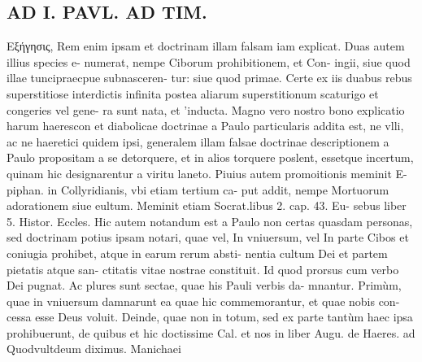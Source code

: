 \documentclass{article}
\begin{document}
\begin{pages}
\section*{AD I. PAVL. AD TIM. }
\marginpar{[ p.188 ]}\pstart Εξήγησις, Rem enim ipsam et doctrinam illam falsam iam explicat. Duas autem illius species e- numerat, nempe Ciborum prohibitionem, et Con- ingii, siue quod illae tuncipraecpue subnasceren- tur: siue quod primae. Certe ex iis duabus rebus superstitiose interdictis infinita postea aliarum superstitionum scaturigo et congeries vel gene- ra sunt nata, et ’inducta. Magno vero nostro bono explicatio harum haerescon et diabolicae doctrinae a Paulo particularis addita est, ne vlli, ac ne haeretici quidem ipsi, generalem illam falsae doctrinae descriptionem a Paulo propositam a se detorquere, et in alios torquere poslent, essetque  incertum, quinam hic designarentur a viritu laneto. Piuius autem promoitionis meminit E- piphan. in Collyridianis, vbi etiam tertium ca- put addit, nempe Mortuorum adorationem siue eultum. Meminit etiam Socrat.libus 2. cap. 43. Eu- sebus liber 5. Histor. Eccles.  \pend\pstart Hic autem notandum est a Paulo non certas quasdam personas, sed doctrinam potius ipsam notari, quae vel, In vniuersum, vel In parte Cibos et coniugia prohibet, atque in earum rerum absti- nentia cultum Dei et partem pietatis atque san- ctitatis vitae nostrae constituit. Id quod prorsus cum verbo Dei pugnat.  \pend\pstart Ac plures sunt sectae, quae his Pauli verbis da- mnantur. Primùm, quae in vniuersum damnarunt ea quae hic commemorantur, et quae nobis con- cessa esse Deus voluit. Deinde, quae non in totum, sed ex parte tantùm haec ipsa prohibuerunt, de quibus et hic doctissime Cal. et nos in liber  Augu. de Haeres. ad Quodvultdeum diximus. Manichaei  \pend

\end{pages}
\end{document}

